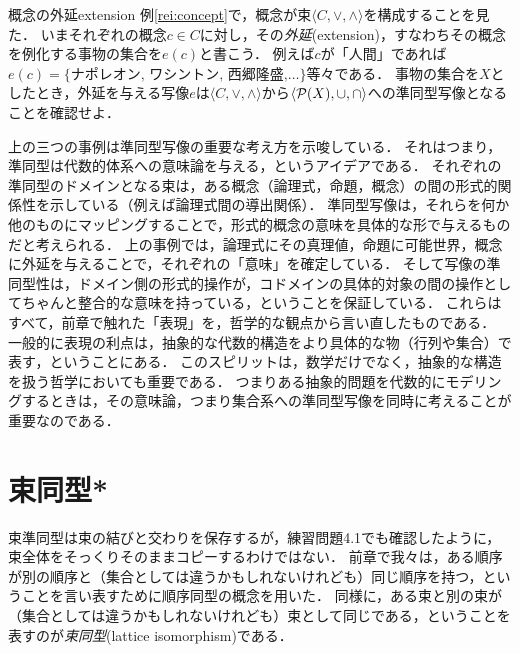 \documentclass[11pt,a4paper, dvipdfmx]{jsarticle}
\begin{document}
\begin{rei}{概念の外延}{extension}
例\ref{rei:concept}で，概念が束$\langle C, \vee, \wedge \rangle$を構成することを見た．
いまそれぞれの概念$c \in C$に対し，その\emph{外延}(extension)，すなわちその概念を例化する事物の集合を$e(c)$と書こう．
例えば$c$が「人間」であれば$e(c)=\{\text{ナポレオン, ワシントン, 西郷隆盛,}\dots\}$等々である．
事物の集合を$X$としたとき，外延を与える写像$e$は$\langle C, \vee, \wedge \rangle$から$\langle \mathcal{P}(X), \cup, \cap \rangle$への準同型写像となることを確認せよ．
\end{rei}



上の三つの事例は準同型写像の重要な考え方を示唆している．
それはつまり，準同型は代数的体系への意味論を与える，というアイデアである．
それぞれの準同型のドメインとなる束は，ある概念（論理式，命題，概念）の間の形式的関係性を示している（例えば論理式間の導出関係）．
準同型写像は，それらを何か他のものにマッピングすることで，形式的概念の意味を具体的な形で与えるものだと考えられる．
上の事例では，論理式にその真理値，命題に可能世界，概念に外延を与えることで，それぞれの「意味」を確定している．
そして写像の準同型性は，ドメイン側の形式的操作が，コドメインの具体的対象の間の操作としてちゃんと整合的な意味を持っている，ということを保証している．
これらはすべて，前章で触れた「表現」を，哲学的な観点から言い直したものである．
一般的に表現の利点は，抽象的な代数的構造をより具体的な物（行列や集合）で表す，ということにある．
このスピリットは，数学だけでなく，抽象的な構造を扱う哲学においても重要である．
つまりある抽象的問題を代数的にモデリングするときは，その意味論，つまり集合系への準同型写像を同時に考えることが重要なのである．


\section{束同型*}
束準同型は束の結びと交わりを保存するが，練習問題4.1でも確認したように，束全体をそっくりそのままコピーするわけではない．
前章で我々は，ある順序が別の順序と（集合としては違うかもしれないけれども）同じ順序を持つ，ということを言い表すために順序同型の概念を用いた．
同様に，ある束と別の束が（集合としては違うかもしれないけれども）束として同じである，ということを表すのが\emph{束同型}(lattice isomorphism)である．
\end{document}
